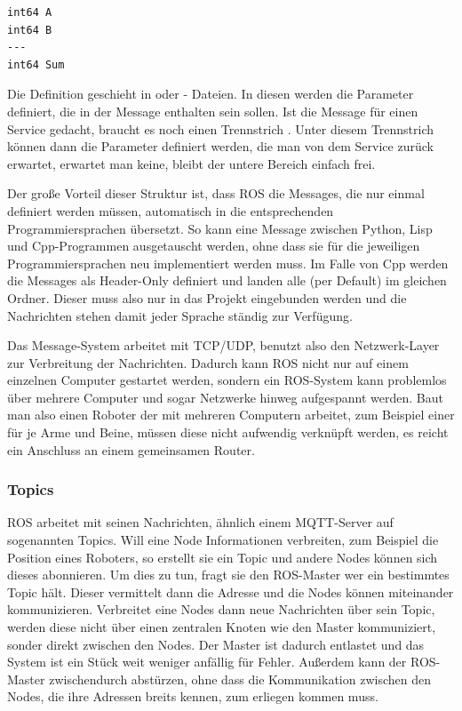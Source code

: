 \begin{lstlisting}[style=ros, title=Message für einen Service der 2 Zahlen addiert und das Ergebnis zurück gibt]
int64 A
int64 B
---
int64 Sum
\end{lstlisting}

Die Definition geschieht in  oder  - Dateien. In diesen werden die Parameter definiert, die in der Message enthalten sein sollen. Ist die Message für einen Service gedacht, braucht es noch einen Trennstrich \highlight{---}. Unter diesem Trennstrich können dann die Parameter definiert werden, die man von dem Service zurück erwartet, erwartet man keine, bleibt der untere Bereich einfach frei.

Der große Vorteil dieser Struktur ist, dass \ac{ROS} die Messages, die nur einmal definiert werden müssen, automatisch in die entsprechenden Programmiersprachen übersetzt. So kann eine Message zwischen Python, Lisp und Cpp-Programmen ausgetauscht werden, ohne dass sie für die jeweiligen Programmiersprachen neu implementiert werden muss. Im Falle von Cpp werden die Messages als Header-Only definiert und landen alle (per Default) im gleichen Ordner. Dieser muss also nur in das Projekt eingebunden werden und die Nachrichten stehen damit jeder Sprache ständig zur Verfügung.

Das Message-System arbeitet mit TCP/UDP, benutzt also den Netzwerk-Layer zur Verbreitung der Nachrichten. Dadurch kann \ac{ROS} nicht nur auf einem einzelnen Computer gestartet werden, sondern ein \ac{ROS}-System kann problemlos über mehrere Computer und sogar Netzwerke hinweg aufgespannt werden. Baut man also einen Roboter der mit mehreren Computern arbeitet, zum Beispiel einer für je Arme und Beine, müssen diese nicht aufwendig verknüpft werden, es reicht ein Anschluss an einem gemeinsamen Router.

\subsubsection*{Topics}
\ac{ROS} arbeitet mit seinen Nachrichten, ähnlich einem MQTT-Server auf sogenannten Topics\cite{ROS_TOPICS}. Will eine Node Informationen verbreiten, zum Beispiel die Position eines Roboters, so erstellt sie ein Topic und andere Nodes können sich dieses abonnieren. Um dies zu tun, fragt sie den \ac{ROS}-Master wer ein bestimmtes Topic hält. Dieser vermittelt dann die Adresse und die Nodes können miteinander kommunizieren. Verbreitet eine Nodes dann neue Nachrichten über sein Topic, werden diese nicht über einen zentralen Knoten wie den Master kommuniziert, sonder direkt zwischen den Nodes. Der Master ist dadurch entlastet und das System ist ein Stück weit weniger anfällig für Fehler. Außerdem kann der \ac{ROS}-Master zwischendurch abstürzen, ohne dass die Kommunikation zwischen den Nodes, die ihre Adressen breits kennen, zum erliegen kommen muss.

